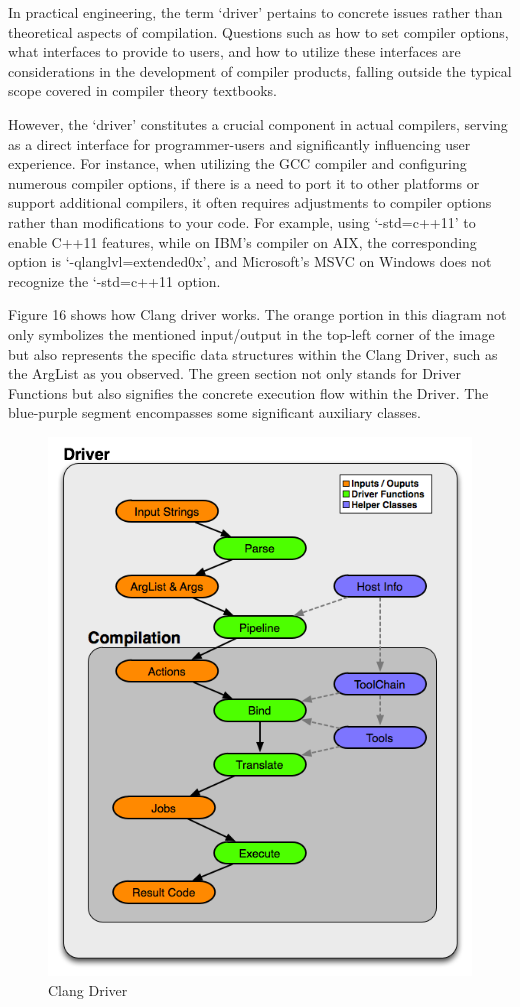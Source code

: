\documentclass[conference]{IEEEtran}
\begin{document}
In practical engineering, the term `driver' pertains to concrete issues rather than theoretical aspects of compilation. Questions such as how to set compiler options, what interfaces to provide to users, and how to utilize these interfaces are considerations in the development of compiler products, falling outside the typical scope covered in compiler theory textbooks.

However, the `driver' constitutes a crucial component in actual compilers, serving as a direct interface for programmer-users and significantly influencing user experience. For instance, when utilizing the GCC compiler and configuring numerous compiler options, if there is a need to port it to other platforms or support additional compilers, it often requires adjustments to compiler options rather than modifications to your code. For example, using `-std=c++11' to enable C++11 features, while on IBM's compiler on AIX, the corresponding option is `-qlanglvl=extended0x', and Microsoft's MSVC on Windows does not recognize the `-std=c++11 option.

Figure 16 shows how Clang driver works. The orange portion in this diagram not only symbolizes the mentioned input/output in the top-left corner of the image but also represents the specific data structures within the Clang Driver, such as the ArgList as you observed. The green section not only stands for Driver Functions but also signifies the concrete execution flow within the Driver. The blue-purple segment encompasses some significant auxiliary classes.

\begin{figure}[htbp]
\centering
\includegraphics [width=0.9\linewidth]{pictures/ClangDriver.png}
\caption{Clang Driver\cite{b12}}
\label{fig16}
\end{figure}
\end{document}
